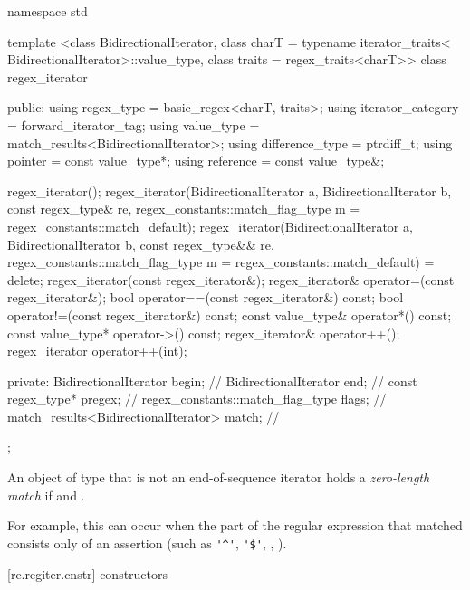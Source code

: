 \begin{codeblock}
namespace std {
  template <class BidirectionalIterator,
            class charT = typename iterator_traits<
              BidirectionalIterator>::value_type,
            class traits = regex_traits<charT>>
  class regex_iterator {
  public:
     using regex_type        = basic_regex<charT, traits>;
     using iterator_category = forward_iterator_tag;
     using value_type        = match_results<BidirectionalIterator>;
     using difference_type   = ptrdiff_t;
     using pointer           = const value_type*;
     using reference         = const value_type&;

     regex_iterator();
     regex_iterator(BidirectionalIterator a, BidirectionalIterator b,
                    const regex_type& re,
                    regex_constants::match_flag_type m =
                      regex_constants::match_default);
     regex_iterator(BidirectionalIterator a, BidirectionalIterator b,
                    const regex_type&& re,
                    regex_constants::match_flag_type m =
                      regex_constants::match_default) = delete;
     regex_iterator(const regex_iterator&);
     regex_iterator& operator=(const regex_iterator&);
     bool operator==(const regex_iterator&) const;
     bool operator!=(const regex_iterator&) const;
     const value_type& operator*() const;
     const value_type* operator->() const;
     regex_iterator& operator++();
     regex_iterator operator++(int);

  private:
     BidirectionalIterator                begin;  // \expos
     BidirectionalIterator                end;    // \expos
     const regex_type*                    pregex; // \expos
     regex_constants::match_flag_type     flags;  // \expos
     match_results<BidirectionalIterator> match;  // \expos
  };
}
\end{codeblock}

\pnum
{}%
An object of type  that is not an end-of-sequence iterator
holds a \textit{zero-length match} if  and
. \begin{note} For
example, this can occur when the part of the regular expression that
matched consists only of an assertion (such as \verb|'^'|, \verb|'$'|,
, ). \end{note}

[re.regiter.cnstr]{ constructors}

